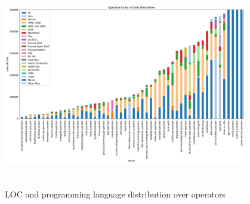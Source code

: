 \begin{figure}
    \centering
    \includegraphics[width=0.95\textwidth,height=9cm]{figures/operator-loc-bar.png}
    \caption{LOC and programming language distribution over operators}
    \label{fig:loc}
\end{figure}

